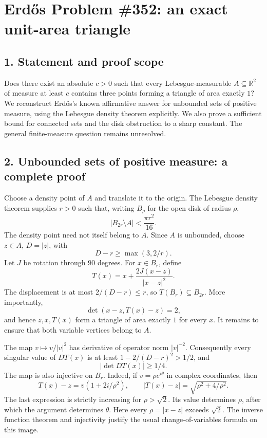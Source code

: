 \section*{Erd\H{o}s Problem \#352: an exact unit-area triangle}
\subsection*{1. Statement and proof scope}
Does there exist an absolute $c>0$ such that every Lebesgue-measurable
$A\subseteq\mathbb R^2$ of measure at least $c$ contains three points
forming a triangle of area exactly $1$?
We reconstruct Erd\H{o}s's known affirmative answer for unbounded
sets of positive measure, using the Lebesgue density theorem explicitly.
We also prove a sufficient bound for connected sets and the disk
obstruction to a sharp constant. The general finite-measure question
remains unresolved.

\subsection*{2. Unbounded sets of positive measure: a complete proof}
Choose a density point of $A$ and translate it to the origin. The
Lebesgue density theorem supplies $r>0$ such that, writing $B_\rho$
for the open disk of radius $\rho$,
\[
 |B_{2r}\setminus A|<\frac{\pi r^2}{16}.            \tag{1}
\]
The density point need not itself belong to $A$. Since $A$ is unbounded,
choose $z\in A$, $D=|z|$, with
\[
 D-r\ge\max(3,2/r).
\]
Let $J$ be rotation through $90$ degrees. For $x\in B_r$, define
\[
 T(x)=x+\frac{2J(x-z)}{|x-z|^2}.
\]
The displacement is at most $2/(D-r)\le r$, so $T(B_r)\subseteq B_{2r}$.
More importantly,
\[
 \det(x-z,T(x)-z)=2,
\]
and hence $z,x,T(x)$ form a triangle of area exactly $1$ for every $x$.
It remains to ensure that both variable vertices belong to $A$.

The map $v\mapsto v/|v|^2$ has derivative of operator norm $|v|^{-2}$.
Consequently every singular value of $DT(x)$ is at least
$1-2/(D-r)^2>1/2$, and
\[
 |\det DT(x)|\ge1/4.                              \tag{2}
\]
The map is also injective on $B_r$. Indeed, if
$v=\rho e^{i\theta}$ in complex coordinates, then
\[
 T(x)-z=v(1+2i/\rho^2),\qquad
 |T(x)-z|=\sqrt{\rho^2+4/\rho^2}.
\]
The last expression is strictly increasing for $\rho>\sqrt2$.
Its value determines $\rho$, after which the argument determines
$\theta$. Here every $\rho=|x-z|$ exceeds $\sqrt2$.
The inverse function theorem and injectivity justify the usual
change-of-variables formula on this image.

